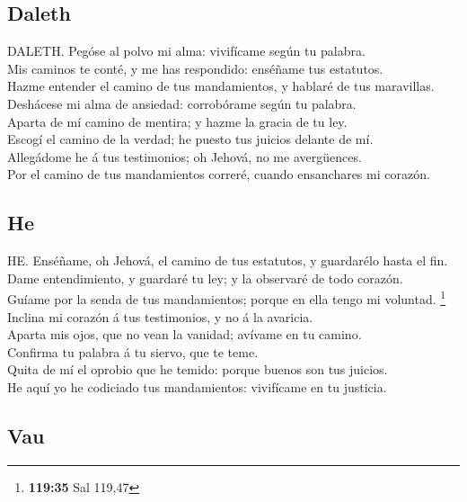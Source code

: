 \hypertarget{daleth}{%
\subsection{Daleth}\label{daleth}}

 DALETH. Pegóse al polvo mi alma: vivifícame según tu
palabra.\\
 Mis caminos te conté, y me has respondido: enséñame tus
estatutos.\\
 Hazme entender el camino de tus mandamientos, y hablaré
de tus maravillas.\\
 Deshácese mi alma de ansiedad: corrobórame según tu
palabra.\\
 Aparta de mí camino de mentira; y hazme la gracia de tu
ley.\\
 Escogí el camino de la verdad; he puesto tus juicios
delante de mí.\\
 Allegádome he á tus testimonios; oh Jehová, no me
avergüences.\\
 Por el camino de tus mandamientos correré, cuando
ensanchares mi corazón.

\hypertarget{he}{%
\subsection{He}\label{he}}

 HE. Enséñame, oh Jehová, el camino de tus estatutos, y
guardarélo hasta el fin.\\
 Dame entendimiento, y guardaré tu ley; y la observaré de
todo corazón.\\
 Guíame por la senda de tus mandamientos; porque en ella
tengo mi voluntad. \footnote{\textbf{119:35} Sal 119,47}\\
 Inclina mi corazón á tus testimonios, y no á la
avaricia.\\
 Aparta mis ojos, que no vean la vanidad; avívame en tu
camino.\\
 Confirma tu palabra á tu siervo, que te teme.\\
 Quita de mí el oprobio que he temido: porque buenos son
tus juicios.\\
 He aquí yo he codiciado tus mandamientos: vivifícame en
tu justicia.

\hypertarget{vau}{%
\subsection{Vau}\label{vau}}

